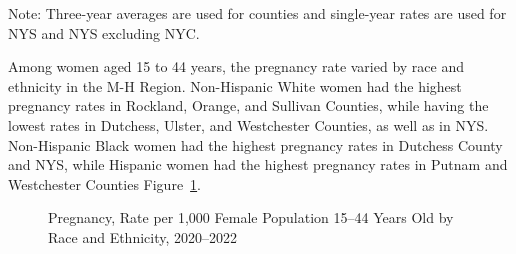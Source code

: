 \documentclass[
  english,
  letterpaper,
]{report}
\begin{document}
\begin{tcolorbox}[enhanced jigsaw, breakable, leftrule=.75mm, title=\textcolor{quarto-callout-note-color}{\faInfo}\hspace{0.5em}{Note}, bottomrule=.15mm, opacityback=0, left=2mm, colback=white, bottomtitle=1mm, coltitle=black, colbacktitle=quarto-callout-note-color!10!white, colframe=quarto-callout-note-color-frame, opacitybacktitle=0.6, toptitle=1mm, titlerule=0mm, arc=.35mm, rightrule=.15mm, toprule=.15mm]

Note: Three-year averages are used for counties and single-year rates
are used for NYS and NYS excluding NYC.

\end{tcolorbox}

Among women aged 15 to 44 years, the pregnancy rate varied by race and
ethnicity in the M-H Region. Non-Hispanic White women had the highest
pregnancy rates in Rockland, Orange, and Sullivan Counties, while having
the lowest rates in Dutchess, Ulster, and Westchester Counties, as well
as in NYS. Non-Hispanic Black women had the highest pregnancy rates in
Dutchess County and NYS, while Hispanic women had the highest pregnancy
rates in Putnam and Westchester Counties
Figure~\ref{fig-15to44-preg-rate-rande}.

\begin{figure}


\caption{\label{fig-15to44-preg-rate-rande}Pregnancy, Rate per 1,000
Female Population 15--44 Years Old by Race and Ethnicity, 2020--2022}

\end{figure}%
\end{document}
